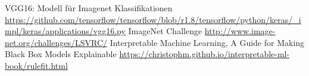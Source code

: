 \documentclass[
  12pt, %
  a4paper, %
  oneside, %
  openany, 
  numbers=noenddot, %
  BCOR=5mm, %
  parskip=half*, %
  thesis, %
]{bfhbook}
\begin{document}
\renewcommand\bibname{Linkverzeichnis}
\begin{thebibliography}{99}\label{links}
    VGG16: Modell für Imagenet Klassifikationen \break \url{https://github.com/tensorflow/tensorflow/blob/r1.8/tensorflow/python/keras/_impl/keras/applications/vgg16.py}
    ImageNet Challenge \break \url{http://www.image-net.org/challenges/LSVRC/}
   Interpretable Machine Learning, A Guide for Making Black Box Models Explainable \break \url{https://christophm.github.io/interpretable-ml-book/rulefit.html}
\end{thebibliography}
\lstlistoflistings
\endgroup
\end{document}
